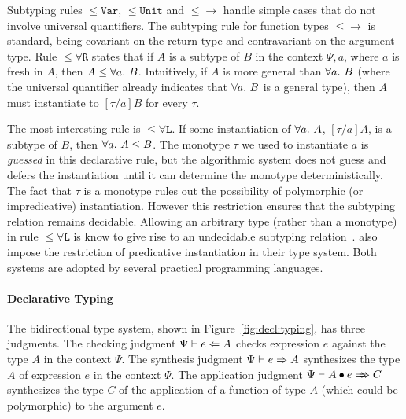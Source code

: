 Subtyping rules $\mathtt{{\le}Var}$, $\mathtt{{\le}Unit}$ and $\mathtt{{\le}{\to}}$
handle simple cases that do not involve universal quantifiers.
The subtyping rule for function types $\mathtt{{\le}{\to}}$ is standard,
being covariant on the return type and contravariant on the argument type.
Rule $\mathtt{{\le}\forall R}$ states that if $A$ is a subtype of $B$
in the context $\Psi, a$, where $a$ is fresh in $A$, then $A\le\all B$.
Intuitively, if $A$ is more general than $\all B$ (where the universal quantifier
already indicates that $\all B$ is a general type),
then $A$ must instantiate to $[\tau/a]B$ for every $\tau$.

The most interesting rule is $\mathtt{{\le}\forall L}$.
If some instantiation of $\all A$, $[\tau/a]A$, is a subtype of $B$,
then $\all A \le B$.
The monotype $\tau$ we used to instantiate $a$ is \emph{guessed} in this
declarative rule, but the algorithmic system does not guess and defers the
instantiation until it can determine the monotype deterministically.
The fact that $\tau$ is a monotype rules out the possibility of
polymorphic (or impredicative) instantiation.
However this restriction ensures that the subtyping relation remains
decidable. Allowing an arbitrary type (rather than a monotype) in rule $\mathtt{{\le}\forall L}$
is know to give rise to an undecidable subtyping relation~\cite{tiuryn1996subtyping}.
\citet{jones2007practical} also impose the restriction of
predicative instantiation in their type system.
Both systems are adopted by several practical programming languages.

\paragraph{Declarative Typing}
The bidirectional type system, shown in Figure~\ref{fig:decl:typing}, has three judgments.
The checking judgment $\Psi\vdash e\Leftarrow A$ checks expression $e$ against the type $A$ in the context $\Psi$.
The synthesis judgment $\Psi\vdash e\Rightarrow A$ synthesizes the type $A$ of expression $e$ in the context $\Psi$.
The application judgment $\Psi\vdash \appInf{A}{e}{C}$ synthesizes the type $C$ of the application of a function of type $A$
(which could be polymorphic) to the argument $e$.

